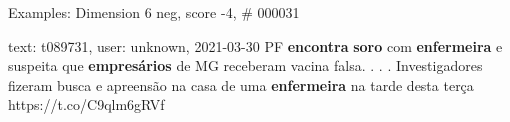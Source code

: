 \begin{frame}{Examples: Dimension 6 neg, score -4, \# 000031}
\footnotesize
\begin{alertblock}{text: t089731, user: unknown, 2021-03-30}
PF \textbf{encontra} \textbf{soro} com \textbf{enfermeira} e suspeita que 
\textbf{empresários} de MG receberam vacina falsa. . . . Investigadores fizeram 
busca e apreensão na casa de uma \textbf{enfermeira} na tarde desta terça 
https://t.co/C9qlm6gRVf 
\end{alertblock}
\end{frame}
